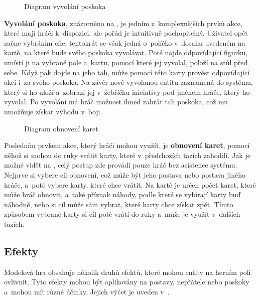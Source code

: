 \begin{figure}[h]
    \centering
    \caption{Diagram vyvolání poskoka}
    \label{diag:summon}
\end{figure}

\textbf{Vyvolání poskoka}, znázorněno na , je jedním z~komplexnějších prvků akce, které mají hráči k~dispozici, ale pořád je intuitivně pochopitelný. Uživatel opět začne vybráním cíle, tentokrát se však jedná o~políčko v~dosahu uvedeném na kartě, na které bude svého poskoka vyvolávat. Poté najde odpovídající figurku, umístí ji na vybrané pole a~kartu, pomocí které jej vyvolal, položí na stůl před sebe. Když pak dojde na jeho tah, může pomocí této karty provést odpovídající akci i~za svého poskoka. Na závěr nově vyvolanou entitu zaznamená do systému, který si ho uloží a~zobrazí jej v~žebříčku iniciativy pod jménem hráče, který ho vyvolal. Po vyvolání má hráč možnost ihned zahrát tah poskoka, což mu umožňuje získat výhodu v~boji.

\begin{figure}[h]
    \centering
    \caption{Diagram obnovení karet}
    \label{diag:restore_cards}
\end{figure}

Posledním prvkem akce, který hráči mohou využít, je \textbf{obnovení karet}, pomocí něhož si mohou do ruky vrátit karty, které v~předchozích tazích zahodili. Jak je možné vidět na , celý postup zde provádí pouze hráč bez asistence systému. Nejprve si vybere cíl obnovení, což může být jeho postava nebo postava jiného hráče, a~poté vybere karty, které chce vrátit. Na kartě je určen počet karet, které může hráč obnovit, a~také příznak náhody, podle které se vybírají karty buď náhodně, nebo si cíl může sám vybrat, které karty chce získat zpět. Tímto způsobem vybrané karty si cíl poté vrátí do ruky a~může je využít v~dalších tazích.



\subsection{Efekty}
\label{subsec:design_effects}

Modelová hra obsahuje několik druhů efektů, které mohou entity na herním poli ovlivnit. Tyto efekty mohou být aplikovány na postavy, nepřátele nebo poskoky a~mohou mít různé účinky. Jejich výčet je uveden v~.

